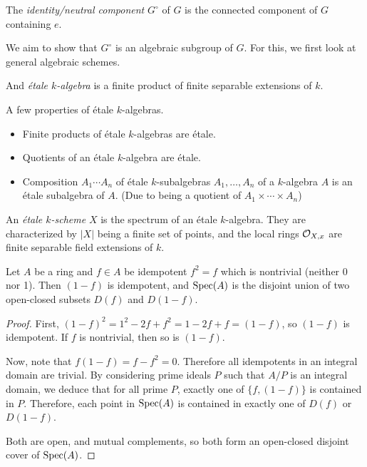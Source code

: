 \documentclass{memoir}
\begin{document}
\begin{definition}
	The \emph{identity/neutral component} $G^\circ$ of $G$ is
	the connected component of $G$ containing $e$.
\end{definition}

We aim to show that $G^\circ$ is an algebraic subgroup of $G$.
For this, we first look at general algebraic schemes.

\begin{definition}
	And \emph{étale $k$-algebra} is a finite product of finite
	separable extensions of $k$.
\end{definition}

A few properties of étale $k$-algebras.

\begin{itemize}
	\item Finite products of étale $k$-algebras are étale.
	\item Quotients of an étale $k$-algebra are étale.
	\item Composition $A_1 \cdots A_n$ of étale $k$-subalgebras
	$A_1, \ldots, A_n$ of a $k$-algebra $A$ is an étale subalgebra of $A$.
	(Due to being a quotient of $A_1 \times \cdots \times A_n$)
\end{itemize}

\begin{definition}
	An \emph{étale $k$-scheme} $X$ is the spectrum of an étale $k$-algebra.
	They are characterized by $|X|$ being a finite set of points, and the
	local rings $\mathcal{O}_{X,x}$ are finite separable field extensions of $k$.
\end{definition}

\begin{lemma}
	Let $A$ be a ring and $f\in A$ be idempotent $f^2 = f$ which is
	nontrivial (neither 0 nor 1). Then $(1-f)$ is idempotent, and $\operatorname{Spec}(A)$
	is the disjoint union of two open-closed subsets $D(f)$ and $D(1-f)$.
\end{lemma}

\begin{proof}
	First, $(1-f)^2= 1^2 - 2f + f^2 = 1- 2f + f = (1 - f)$, so $(1-f)$ is
	idempotent. If $f$ is nontrivial, then so is $(1-f)$.
	
	Now, note that $f(1-f) = f - f^2 = 0$. Therefore all idempotents in
	an integral domain are trivial. By considering prime ideals $P$ such
	that $A/P$ is an integral domain, we deduce that for all prime $P$,
	exactly one of $\{f, (1-f)\}$ is contained in $P$. Therefore, each
	point in $\operatorname{Spec}(A)$ is contained in exactly one of $D(f)$ or $D(1-f)$.
	
	Both are open, and mutual complements, so both form an open-closed
	disjoint cover of $\operatorname{Spec}(A)$.
\end{proof}
\end{document}
